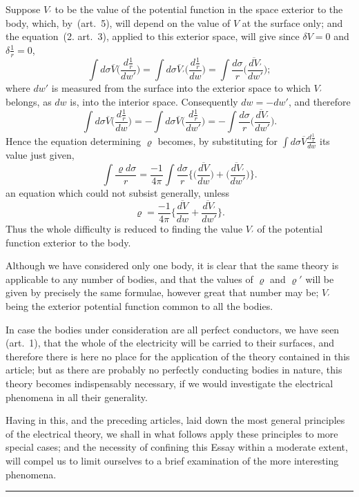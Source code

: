 \documentclass[12pt,notitlepage]{amsart}
\def\Crule{\begin{center}\rule[.5ex]{5em}{.2pt}\\[10pt]\end{center}}
\renewcommand{\rho}{\varrho}
\begin{document}
Suppose $V_\prime$ to be the value of the potential function in the space 
exterior to the body, which, by~(art.~5), will depend
on the value of $V$ at the
surface only; and the equation~(2. art.~3), applied to this exterior space,
will give since ${\delta V=0}$ and ${\delta\frac1r=0}$,
\[
  \int d\sigma\overline{V}
  \biggl(\frac{d\frac1r}{dw'}\biggr)
  =\int d\sigma\overline{V}_\prime
  \biggl(\frac{d\frac1r}{dw}\biggr)
  =\int\frac{d\sigma}{r}
  \biggl(\frac{\overline{dV}_\prime}{dw'}\biggr);
\]
where $dw'$ is measured from the surface into the exterior space
to which $V_\prime$
belongs, as $dw$ is, into the interior space. Consequently ${dw=-dw'}$,
and therefore
\[
  \int d\sigma\overline{V}
  \biggl(\frac{d\frac1r}{dw}\biggr)
  =-\int d\sigma\overline{V}
  \biggl(\frac{d\frac1r}{dw'}\biggr)
  =-\int\frac{d\sigma}{r}
  \biggl(\frac{\overline{dV}_\prime}{dw'}\biggr).
\]
Hence the equation determining $\rho$ becomes,
by substituting for $\int d\sigma\overline{V}\frac{d\frac1r}{dw}$
its value just given,
\[
\int\frac{\rho d\sigma}{r}
=\frac{-1}{4\pi} \int\frac{d\sigma}{r}\biggl\{
  \biggl(\frac{\overline{dV}}{dw}\biggr)
  +\biggl(\frac{\overline{dV}_\prime}{dw'}\biggr)
\biggr\}.
\]
an equation which could not subsist generally, unless
\[
\tag{7.}
\rho=\frac{-1}{4\pi}\biggl\{
  \frac{\overline{dV}}{dw}+\frac{\overline{dV}_\prime}{dw'}
\biggr\}.
\]
Thus the whole difficulty is reduced to finding
the value $V_\prime$ of the potential
function exterior to the body.

Although we have considered only one body, it is clear that the same
theory is applicable to any number of bodies,
and that the values of $\rho$ and $\rho'$
will be given by precisely the same formulae, however great that number may
be; $V_\prime$ being the exterior potential function common to all the bodies.

In case the bodies under consideration are all perfect conductors, we
have seen (art.~1), that the whole of the electricity will be carried to their
surfaces, and therefore there is here no place for the application of the theory
contained in this article; but as there are probably no perfectly conducting
bodies in nature, this theory becomes indispensably necessary, if we would
investigate the electrical phenomena in all their generality.

Having in this, and the preceding articles, laid down the most general
principles of the electrical theory, we shall in what follows apply these 
principles to more special cases;
and the necessity of confining this Essay within
a moderate extent, will compel us to limit ourselves to a brief examination of
the more interesting phenomena.
\bigskip
\Crule
\end{document}
